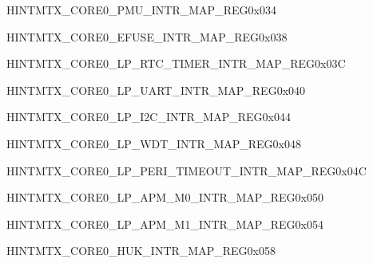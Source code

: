 \begin{register}{H}{INTMTX\_CORE0\_PMU\_INTR\_MAP\_REG}{0x034}\label{regdesc:INTMTXCORE0PMUINTRMAPREG} \end{register}\vspace{-3em}
\begin{register}{H}{INTMTX\_CORE0\_EFUSE\_INTR\_MAP\_REG}{0x038}\label{regdesc:INTMTXCORE0EFUSEINTRMAPREG} \end{register}\vspace{-3em}
\begin{register}{H}{INTMTX\_CORE0\_LP\_RTC\_TIMER\_INTR\_MAP\_REG}{0x03C}\label{regdesc:INTMTXCORE0LPRTCTIMERINTRMAPREG} \end{register}\vspace{-3em}
\begin{register}{H}{INTMTX\_CORE0\_LP\_UART\_INTR\_MAP\_REG}{0x040}\label{regdesc:INTMTXCORE0LPUARTINTRMAPREG} \end{register}\vspace{-3em}
\begin{register}{H}{INTMTX\_CORE0\_LP\_I2C\_INTR\_MAP\_REG}{0x044}\label{regdesc:INTMTXCORE0LPI2CINTRMAPREG} \end{register}\vspace{-3em}
\begin{register}{H}{INTMTX\_CORE0\_LP\_WDT\_INTR\_MAP\_REG}{0x048}\label{regdesc:INTMTXCORE0LPWDTINTRMAPREG} \end{register}\vspace{-3em}
\begin{register}{H}{INTMTX\_CORE0\_LP\_PERI\_TIMEOUT\_INTR\_MAP\_REG}{0x04C}\label{regdesc:INTMTXCORE0LPPERITIMEOUTINTRMAPREG} \end{register}\vspace{-3em}
\begin{register}{H}{INTMTX\_CORE0\_LP\_APM\_M0\_INTR\_MAP\_REG}{0x050}\label{regdesc:INTMTXCORE0LPAPMM0INTRMAPREG} \end{register}\vspace{-3em}
\begin{register}{H}{INTMTX\_CORE0\_LP\_APM\_M1\_INTR\_MAP\_REG}{0x054}\label{regdesc:INTMTXCORE0LPAPMM1INTRMAPREG} \end{register}\vspace{-3em}
\begin{register}{H}{INTMTX\_CORE0\_HUK\_INTR\_MAP\_REG}{0x058}\label{regdesc:INTMTXCORE0HUKINTRMAPREG} \end{register}\vspace{-3em}
